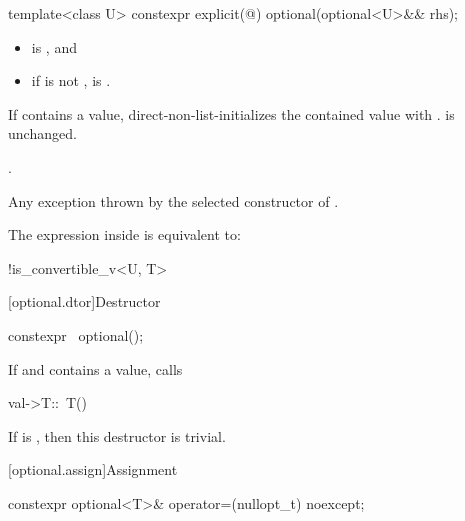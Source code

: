 %
\begin{itemdecl}
template<class U> constexpr explicit(@\seebelow@) optional(optional<U>&& rhs);
\end{itemdecl}

\begin{itemdescr}
\pnum
\constraints
\begin{itemize}
\item {} is , and
\item if  is not \cv{} ,
 is .
\end{itemize}

\pnum
\effects
If  contains a value,
direct-non-list-initializes the contained value with .
 is unchanged.

\pnum
\ensures
{}.

\pnum
\throws
Any exception thrown by the selected constructor of .

\pnum
\remarks
The expression inside  is equivalent to:
\begin{codeblock}
!is_convertible_v<U, T>
\end{codeblock}
\end{itemdescr}

[optional.dtor]{Destructor}

%
\begin{itemdecl}
constexpr ~optional();
\end{itemdecl}

\begin{itemdescr}
\pnum
\effects
If  and  contains a value, calls
\begin{codeblock}
val->T::~T()
\end{codeblock}

\pnum
\remarks
If  is , then this destructor is trivial.
\end{itemdescr}

[optional.assign]{Assignment}

%
\begin{itemdecl}
constexpr optional<T>& operator=(nullopt_t) noexcept;
\end{itemdecl}

